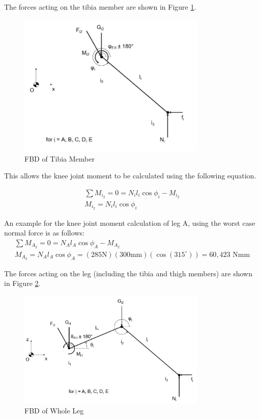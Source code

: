 The forces acting on the tibia member are shown in Figure \ref{fig:robot_tibia_fbd}.

\begin{figure}
    \centering
    \includegraphics[width=0.8\textwidth]{4_ComponentProperties/img/robot_tibia_fbd.JPG}
    \caption{FBD of Tibia Member}
    \label{fig:robot_tibia_fbd}
\end{figure}

This allows the knee joint moment to be calculated using the following equation.

\begin{gather}
    \sum M_{i_2} = 0 = N_i l_i \cos{\phi_i} - M_{i_2}
    \\
    M_{i_2} = N_i l_i \cos{\phi_i}
\end{gather}

An example for the knee joint moment calculation of leg A, using the worst case normal force is as follows:
\begin{gather}
    \sum M_{A_2} = 0 = N_A l_A \cos{\phi_A} - M_{A_2}
    \\
    M_{A_2} = N_A l_A \cos{\phi_A} = (285 \text{N})(300 \text{mm})(\cos(315^{\circ})) = 60,423 \text{ Nmm}
\end{gather}

The forces acting on the leg (including the tibia and thigh members) are shown in Figure \ref{fig:robot_leg_fbd}.

\begin{figure}
    \centering
    \includegraphics[width=0.8\textwidth]{4_ComponentProperties/img/robot_leg_fbd.JPG}
    \caption{FBD of Whole Leg}
    \label{fig:robot_leg_fbd}
\end{figure}


